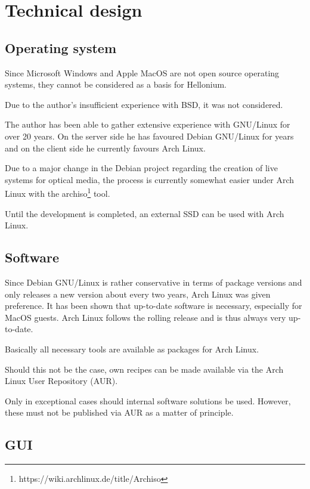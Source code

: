 \chapter{Technical design}
\label{chap:techdesign}

\section{Operating system}

Since Microsoft Windows and Apple MacOS are not open source operating systems, they cannot be considered as a basis for Hellonium.

Due to the author's insufficient experience with BSD, it was not considered.

The author has been able to gather extensive experience with GNU/Linux for over 20 years. On the server side he has favoured Debian GNU/Linux for years and on the client side he currently favours Arch Linux.

Due to a major change in the Debian project regarding the creation of live systems for optical media, the process is currently somewhat easier under Arch Linux with the \glqq{}archiso\grqq{}\footnote{https://wiki.archlinux.de/title/Archiso} tool.

Until the development is completed, an external SSD can be used with Arch Linux.

\section{Software}

Since Debian GNU/Linux is rather conservative in terms of package versions and only releases a new version about every two years, Arch Linux was given preference. It has been shown that up-to-date software is necessary, especially for MacOS guests. Arch Linux follows the rolling release and is thus always very up-to-date.

Basically all necessary tools are available as packages for Arch Linux.

Should this not be the case, own recipes can be made available via the Arch Linux User Repository (AUR).

Only in exceptional cases should internal software solutions be used. However, these must not be published via AUR as a matter of principle.

\section{GUI}

